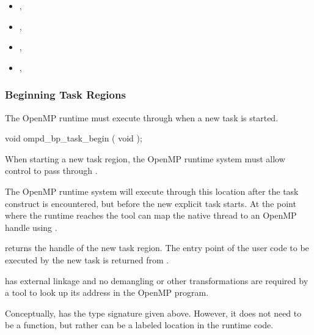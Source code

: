 \crossreferences
\begin{itemize}
\item
  , 
\item
  , 
\item
  , 
\item
  , 
\end{itemize}


\subsubsection{Beginning Task Regions}
\label{subsubsec:ompd_bp_task_begin}

The OpenMP runtime must execute through 
when a new task is started.


\begin{cspecific}
\begin{ompSyntax}
void ompd_bp_task_begin ( void );
\end{ompSyntax}
\end{cspecific}


\descr

When starting a new task region, the OpenMP runtime system
must allow control to pass through .

The OpenMP runtime system will execute through this location after the task
construct is encountered, but before the new explicit task starts.
At the point where the runtime reaches 
the tool can map the native thread to an OpenMP handle using
.

 returns the handle of the new task region.
The entry point of the user code to be executed by the new task
is returned from
.

\restrictions

 has external  linkage and no
demangling or other transformations are required by a tool
to look up its address in the OpenMP program.

Conceptually,  has the type signature
given above.
However, it does not need to be a function, but rather can be a labeled location
in the runtime code.

